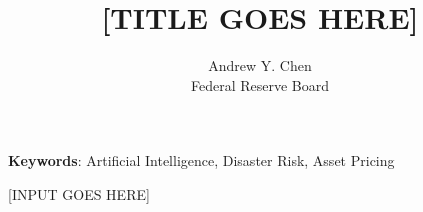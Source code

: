 \documentclass[12pt]{article}
\begin{document}
\title{[TITLE GOES HERE]}
\author{{Andrew Y. Chen}\\
{\normalsize Federal Reserve Board}}
\date{}

\maketitle

 
\begin{abstract}
\begin{singlespace}
\end{singlespace}
\end{abstract}
\vspace{10ex}

\noindent\textbf{Keywords}: Artificial Intelligence, Disaster Risk, Asset Pricing
\thispagestyle{empty}
\newpage


[INPUT GOES HERE]

\newpage
\printbibliography

\newpage
\begin{appendix}
       
     
\end{appendix}
\end{document}
